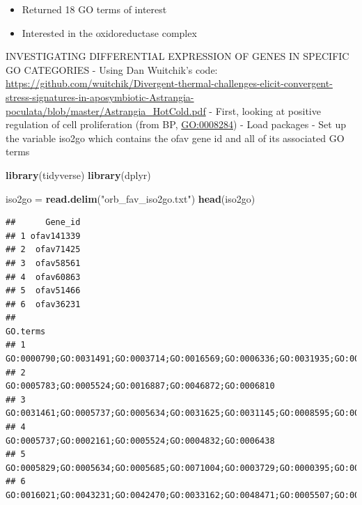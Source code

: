 \documentclass[
]{article}
\newenvironment{Shaded}{\begin{snugshade}}{\end{snugshade}}
\newcommand{\KeywordTok}[1]{\textcolor[rgb]{0.13,0.29,0.53}{\textbf{#1}}}
\newcommand{\NormalTok}[1]{#1}
\newcommand{\StringTok}[1]{\textcolor[rgb]{0.31,0.60,0.02}{#1}}
\providecommand{\tightlist}{%
  \setlength{\itemsep}{0pt}\setlength{\parskip}{0pt}}
\begin{document}
\begin{itemize}
\tightlist
\item
  Returned 18 GO terms of interest
\item
  Interested in the oxidoreductase complex
\end{itemize}

INVESTIGATING DIFFERENTIAL EXPRESSION OF GENES IN SPECIFIC GO CATEGORIES
- Using Dan Wuitchik's code:
\url{https://github.com/wuitchik/Divergent-thermal-challenges-elicit-convergent-stress-signatures-in-aposymbiotic-Astrangia-poculata/blob/master/Astrangia_HotCold.pdf}
- First, looking at positive regulation of cell proliferation (from BP,
\url{GO:0008284}) - Load packages - Set up the variable iso2go which
contains the ofav gene id and all of its associated GO terms

\begin{Shaded}
\begin{Highlighting}[]
\KeywordTok{library}\NormalTok{(tidyverse)}
\KeywordTok{library}\NormalTok{(dplyr)}
\end{Highlighting}
\end{Shaded}

\begin{Shaded}
\begin{Highlighting}[]
\NormalTok{iso2go =}\StringTok{ }\KeywordTok{read.delim}\NormalTok{(}\StringTok{"orb_fav_iso2go.txt"}\NormalTok{)}
\KeywordTok{head}\NormalTok{(iso2go)}
\end{Highlighting}
\end{Shaded}

\begin{verbatim}
##      Gene_id
## 1 ofav141339
## 2  ofav71425
## 3  ofav58561
## 4  ofav60863
## 5  ofav51466
## 6  ofav36231
##                                                                                                                                                                                     GO.terms
## 1                                                                                                               GO:0000790;GO:0031491;GO:0003714;GO:0016569;GO:0006336;GO:0031935;GO:0006351
## 2                                                                                                                                     GO:0005783;GO:0005524;GO:0016887;GO:0046872;GO:0006810
## 3 GO:0031461;GO:0005737;GO:0005634;GO:0031625;GO:0031145;GO:0008595;GO:0008105;GO:0030261;GO:0042078;GO:0019100;GO:0019102;GO:0051232;GO:0007067;GO:1902104;GO:0042787;GO:0051759;GO:0036369
## 4                                                                                                                                     GO:0005737;GO:0002161;GO:0005524;GO:0004832;GO:0006438
## 5                                                                                                    GO:0005829;GO:0005634;GO:0005685;GO:0071004;GO:0003729;GO:0000395;GO:0045292;GO:0006376
## 6                                                                   GO:0016021;GO:0043231;GO:0042470;GO:0033162;GO:0048471;GO:0005507;GO:0004503;GO:0008283;GO:0042438;GO:0043473;GO:0048538
\end{verbatim}
\end{document}
